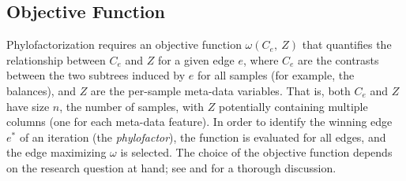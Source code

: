 

\subsection{Objective Function}
\label{sec:Factorization:sub:Methods:sub:ObjectiveFunction}


Phylofactorization requires an objective function $\omega(C_e, ~Z)$
that quantifies the relationship between $C_e$ and $Z$ for a given edge $e$,
where $C_e$ are the contrasts between the two subtrees induced by $e$ for all samples (for example, the balances),
and $Z$ are the per-sample meta-data variables.
That is, both $C_e$ and $Z$ have size $n$, the number of samples,
with $Z$ potentially containing multiple columns (one for each meta-data feature).
In order to identify the winning edge $e^*$ of an iteration (the \emph{phylofactor}),
the function is evaluated for all edges, and the edge maximizing $\omega$ is selected.
The choice of the objective function depends on the research question at hand;
see  and  for a thorough discussion.

